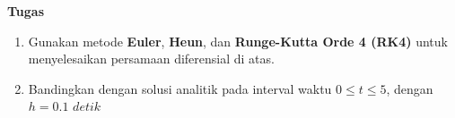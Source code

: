 \newpage
\noindent
\textbf{Tugas}

\begin{enumerate}
    \item Gunakan metode \textbf{Euler}, \textbf{Heun}, dan \textbf{Runge-Kutta Orde 4 (RK4)} untuk menyelesaikan persamaan diferensial di atas.
    \item Bandingkan dengan solusi analitik pada interval waktu $0 \leq t \leq 5$, dengan $h = 0.1$ $detik$
\end{enumerate}